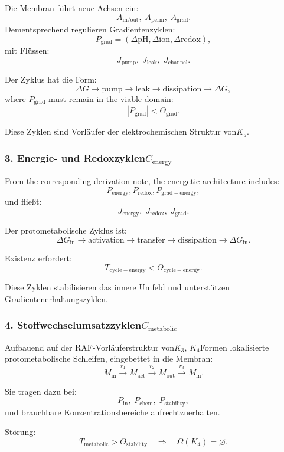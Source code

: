 Die Membran führt neue Achsen ein:
\[
  A_{\mathrm{in/out}},\;
  A_{\mathrm{perm}},\;
  A_{\mathrm{grad}}.
\]
Dementsprechend regulieren Gradientenzyklen:
\[
  P_{\mathrm{grad}}=
    (\Delta \mathrm{pH}, \Delta \mathrm{ion}, \Delta \mathrm{redox}),
\]
mit Flüssen:
\[
  J_{\mathrm{pump}},\;
  J_{\mathrm{leak}},\;
  J_{\mathrm{channel}}.
\]

Der Zyklus hat die Form:
\[
  \Delta G \to \mathrm{pump} \to
  \mathrm{leak} \to \mathrm{dissipation} \to
  \Delta G,
\]
where $P_{\mathrm{grad}}$ must remain in the viable domain:
\[
  |P_{\mathrm{grad}}| < \Theta_{\mathrm{grad}}.
\]

Diese Zyklen sind Vorläufer der elektrochemischen Struktur von$K_5$.

\subsubsection{3. Energie- und Redoxzyklen$C_{\mathrm{energy}}$}

From the corresponding derivation note, the energetic architecture includes:
\[
  P_{\mathrm{energy}},
  P_{\mathrm{redox}},
  P_{\mathrm{grad-energy}},
\]
und fließt:
\[
  J_{\mathrm{energy}},\;
  J_{\mathrm{redox}},\;
  J_{\mathrm{grad}}.
\]

Der protometabolische Zyklus ist:
\[
  \Delta G_{\mathrm{in}} \to 
  \mathrm{activation} \to
  \mathrm{transfer} \to 
  \mathrm{dissipation} \to 
  \Delta G_{\mathrm{in}}.
\]

Existenz erfordert:
\[
  T_{\mathrm{cycle-energy}} < \Theta_{\mathrm{cycle-energy}}.
\]

Diese Zyklen stabilisieren das innere Umfeld und unterstützen
Gradientenerhaltungszyklen.

\subsubsection{4. Stoffwechselumsatzzyklen$C_{\mathrm{metabolic}}$}

Aufbauend auf der RAF-Vorläuferstruktur von$K_3$, $K_4$Formen
lokalisierte protometabolische Schleifen, eingebettet in die Membran:
\[
  M_{\mathrm{in}} \xrightarrow{r_1}
  M_{\mathrm{act}} \xrightarrow{r_2}
  M_{\mathrm{out}} \xrightarrow{r_3}
  M_{\mathrm{in}}.
\]

Sie tragen dazu bei:
\[
  P_{\mathrm{in}},\; P_{\mathrm{chem}},\; P_{\mathrm{stability}},
\]
und brauchbare Konzentrationsbereiche aufrechtzuerhalten.

Störung:
\[
  T_{\mathrm{metabolic}}>\Theta_{\mathrm{stability}}
\quad\Rightarrow\quad
  \Omega(K_4)=\varnothing.
\]

